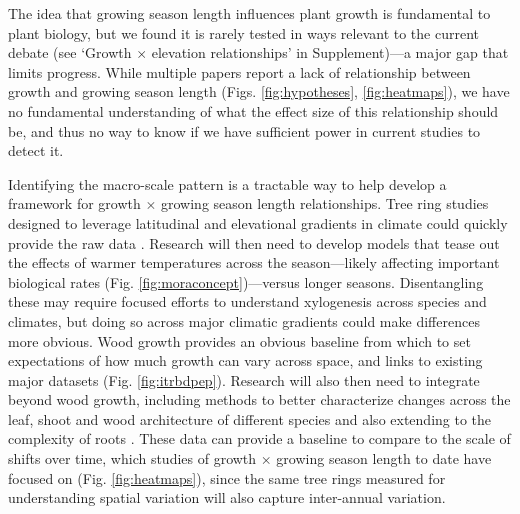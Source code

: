 \documentclass[11pt]{article}
\begin{document}
The idea that growing season length influences plant growth is fundamental to plant biology, but we found it is rarely tested in ways relevant to the current debate (see `Growth $\times$ elevation relationships' in Supplement)---a major gap that limits progress. While multiple papers report a lack of relationship between growth and growing season length (Figs. \ref{fig:hypotheses}, \ref{fig:heatmaps}), we have no fundamental understanding of what the effect size of this relationship should be, and thus no way to know if we have sufficient power in current studies to detect it. %

Identifying the macro-scale pattern is a tractable way to help develop a framework for growth $\times$ growing season length relationships. Tree ring studies designed to leverage latitudinal and elevational gradients in climate could quickly provide the raw data \citep{manzanedo2024moving}. Research will then need to develop models that tease out the effects of warmer temperatures across the season---likely affecting important biological rates  (Fig. \ref{fig:moraconcept})---versus longer seasons. Disentangling these may require focused efforts to understand xylogenesis across species and climates, but doing so across major climatic gradients could make differences more obvious. Wood growth provides an obvious baseline from which to set expectations of how much growth can vary across space, and links to existing major datasets (Fig. \ref{fig:itrbdpep}).  Research will also then need to integrate beyond wood growth, including methods to better characterize changes across the leaf, shoot and wood architecture of different species \citep[e.g.][]{puletti2020lidar,sillett2024ground} and also extending to the complexity of roots \citep{mckown2016impacts,radville2016}. These data can provide a baseline to compare to the scale of shifts over time, which studies of growth $\times$ growing season length to date have focused on (Fig. \ref{fig:heatmaps}), since the same tree rings measured for understanding spatial variation will also capture inter-annual variation. %

\end{document}
